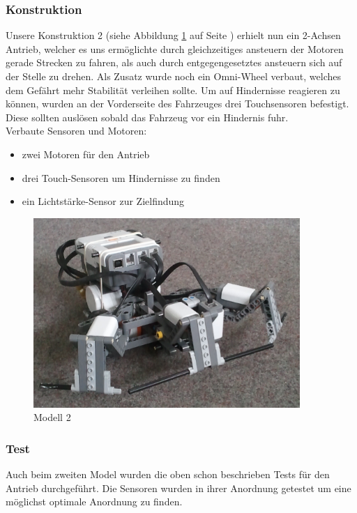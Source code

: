 \documentclass[10pt,a4paper]{scrartcl}
\begin{document}
\subsubsection{Konstruktion}
Unsere Konstruktion 2 (siehe Abbildung \ref{modell2} auf Seite \pageref{modell2}) erhielt nun ein 2-Achsen Antrieb, welcher es uns ermöglichte durch gleichzeitiges ansteuern der Motoren gerade Strecken zu fahren, als auch durch entgegengesetztes ansteuern sich auf der Stelle zu drehen. Als Zusatz wurde noch ein Omni-Wheel verbaut, welches dem Gefährt mehr Stabilität verleihen sollte. Um auf Hindernisse reagieren zu können, wurden an der Vorderseite des Fahrzeuges drei Touchsensoren befestigt. Diese sollten auslösen sobald das Fahrzeug vor ein Hindernis fuhr.\\
Verbaute Sensoren und Motoren:
\begin{itemize}
\item zwei Motoren für den Antrieb
\item drei Touch-Sensoren um Hindernisse zu finden
\item ein Lichtstärke-Sensor zur Zielfindung
\end{itemize}
\begin{figure}[ht]
	\centering
  \includegraphics[width=0.9\textwidth, angle=0]{modell2.jpg}
	\caption{Modell 2}
	\label{modell2}
\end{figure}
\subsubsection{Test}
Auch beim zweiten Model wurden die oben schon beschrieben Tests für den Antrieb durchgeführt. Die Sensoren wurden in ihrer Anordnung getestet um eine möglichst optimale Anordnung zu finden. 
\end{document}
